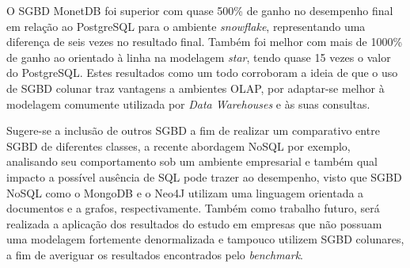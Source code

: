 \documentclass[conference]{IEEEtran}
\begin{document}
O SGBD MonetDB foi superior com quase 500\% de ganho no desempenho final em relação ao PostgreSQL para o ambiente \textit{snowflake}, representando uma diferença de seis vezes no resultado final. Também foi melhor com mais de 1000\% de ganho ao orientado à linha na modelagem \textit{star}, tendo quase 15 vezes o valor do PostgreSQL. Estes resultados como um todo corroboram a ideia de que o uso de SGBD colunar traz vantagens a ambientes OLAP, por adaptar-se melhor à modelagem comumente utilizada por \textit{Data Warehouses} e às suas consultas.

Sugere-se a inclusão de outros SGBD a fim de realizar um comparativo entre SGBD de diferentes classes, a recente abordagem NoSQL por exemplo, analisando seu comportamento sob um ambiente empresarial e também qual impacto a possível ausência de SQL pode trazer ao desempenho, visto que SGBD NoSQL como o MongoDB e o Neo4J utilizam uma linguagem orientada a documentos e a grafos, respectivamente. Também como trabalho futuro, será realizada a aplicação dos resultados do estudo em empresas que não possuam uma modelagem fortemente denormalizada e tampouco utilizem SGBD colunares, a fim de averiguar os resultados encontrados pelo \textit{benchmark}.


%
%

\end{document}
